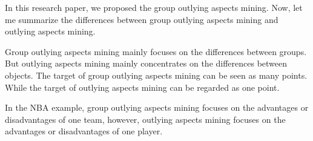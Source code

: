 \documentclass[
 size=14pt,
 paper=smartboard,  %
 mode=present, 		%
 display=slides, 	%
 style=tuliplab,  	%
 pauseslide,
 fleqn,leqno]{powerdot}
\begin{document}





\begin{note}
In this research paper,
we proposed the group outlying aspects mining.
Now,
let me summarize the differences between group outlying aspects mining and outlying aspects mining.

Group outlying aspects mining mainly focuses on the differences between groups.
But outlying aspects mining mainly concentrates on the differences between objects.
The target of group outlying aspects mining can be seen as many points.
While the target of outlying aspects mining can be regarded as one point.

In the NBA example,
group outlying aspects mining focuses on the advantages
or disadvantages of one team,
however,
outlying aspects mining focuses on the advantages or disadvantages of one player.
\end{note}
\end{document}
